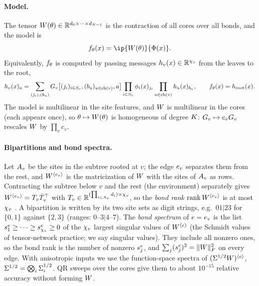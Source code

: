\paragraph{Model.}
The tensor $\W(\params)\in\R^{\pd[0]\times\dots\times\pd[\Ns-1]}$ is the contraction of all cores
over all bonds, and the model is
\begin{equation}\label{eq:model}
  f_\params(x)=\ip{\W(\params)}{\Feat(x)}.
\end{equation}
Equivalently, $f_\params$ is computed by passing messages $h_v(x)\in\R^{\bd{v}}$ from the leaves to
the root,
\begin{equation}\label{eq:messages}
  h_v(x)_a=\sum_{(j_i),(b_u)}\G{v}\big[(j_i)_{i\in\sites{v}},(b_u)_{u\in\ch{v}},a\big]
  \prod_{i\in\sites{v}}\feat{i}(x)_{j_i}\prod_{u\in\ch{v}}h_u(x)_{b_u},
  \qquad
  f_\params(x)=h_{\vroot}(x).
\end{equation}
The model is multilinear in the site features, and $\W$ is multilinear in the cores (each appears
once), so $\params\mapsto\W(\params)$ is homogeneous of degree $\Kc$: $\G{v}\mapsto c_v\G{v}$
rescales $\W$ by $\prod_v c_v$.

\paragraph{Bipartitions and bond spectra.}
Let $\below{v}$ be the sites in the subtree rooted at $v$; the edge $\edge{v}$ separates them from the
rest, and $\mat{\W}{\edge{v}}$ is the matricization of $\W$ with the sites of $\below{v}$ as rows.
Contracting the subtree below $v$ and the rest (the environment) separately gives
$\mat{\W}{\edge{v}}=\Sub{v}\bar T_v\T$ with $\Sub{v}\in\R^{(\prod_{i\in\below{v}}\pd[i])\times\bd{v}}$, so
the \emph{bond rank} $\rank\mat{\W}{\edge{v}}$ is at most $\bd{v}$
\citep{hackbusch2009new,grasedyck2010hierarchical}. A bipartition is written by its two site sets
as digit strings, e.g.\ $01|23$ for $\{0,1\}$ against $\{2,3\}$ (ranges: $0$--$3|4$--$7$). The
\emph{bond spectrum} of $e=\edge{v}$ is the list $\bs{e}{1}\ge\dots\ge\bs{e}{\bd{v}}\ge0$ of the
$\bd{v}$ largest singular values of $\mat{\W}{e}$ (the Schmidt values of tensor-network practice; we
say singular values). They include all nonzero ones, so the bond rank is the number of nonzero
$\bs{e}{j}$, and $\sum_j(\bs{e}{j})^2=\normF{\W}^2$ on every edge. With anisotropic inputs we use the
function-space spectra of $\mat{(\Sig^{1/2}\W)}{e}$, $\Sig^{1/2}=\bigotimes_i\Sigi{i}^{1/2}$. QR sweeps
over the cores give them to about $10^{-15}$ relative accuracy without forming $\W$.

